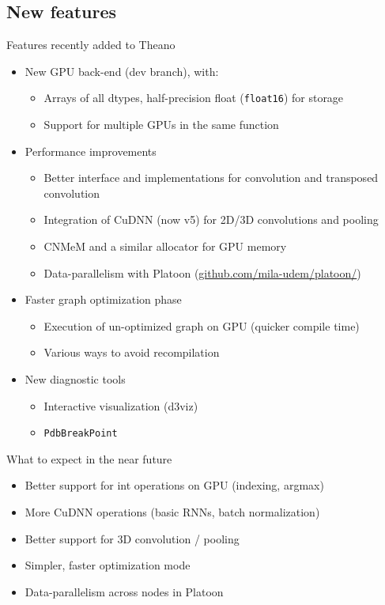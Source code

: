\documentclass[a4paper,9pt]{beamer}
\begin{document}
\subsection{New features}
\begin{frame}[fragile]{Features recently added to Theano}
  \begin{itemize}
    \item New GPU back-end (dev branch), with:
      \begin{itemize}
        \item Arrays of all dtypes, half-precision float (\verb|float16|) for storage
        \item Support for multiple GPUs in the same function
      \end{itemize}
    \item Performance improvements
      \begin{itemize}
        \item Better interface and implementations for convolution and transposed convolution
        \item Integration of CuDNN (now v5) for 2D/3D convolutions and pooling
        \item CNMeM and a similar allocator for GPU memory
        \item Data-parallelism with Platoon (\url{github.com/mila-udem/platoon/})
      \end{itemize}
    \item Faster graph optimization phase
      \begin{itemize}
        \item Execution of un-optimized graph on GPU (quicker compile time)
        \item Various ways to avoid recompilation
      \end{itemize}
    \item New diagnostic tools
      \begin{itemize}
        \item Interactive visualization (d3viz)
        \item \verb|PdbBreakPoint|
      \end{itemize}
  \end{itemize}
\end{frame}

\begin{frame}[fragile]{What to expect in the near future}
  \begin{itemize}
    \item Better support for int operations on GPU (indexing, argmax)
    \item More CuDNN operations (basic RNNs, batch normalization)
    \item Better support for 3D convolution / pooling
    \item Simpler, faster optimization mode
    \item Data-parallelism across nodes in Platoon
  \end{itemize}
\end{frame}
\end{document}
